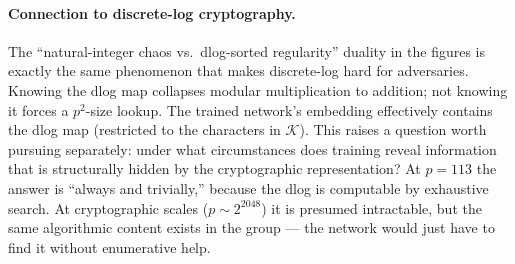 \paragraph{Connection to discrete-log cryptography.}  The
``natural-integer chaos vs.\ dlog-sorted regularity'' duality in the
figures is exactly the same phenomenon that makes discrete-log
hard for adversaries.  Knowing the dlog map collapses modular
multiplication to addition; not knowing it forces a $p^2$-size lookup.
The trained network's embedding effectively contains the dlog
map (restricted to the characters in $\mathcal{K}$).  This raises a
question worth pursuing separately: under what circumstances does
training reveal information that is structurally hidden by the
cryptographic representation?  At $p = 113$ the answer is ``always
and trivially,'' because the dlog is computable by exhaustive search.
At cryptographic scales ($p \sim 2^{2048}$) it is presumed
intractable, but the same algorithmic content exists in the group ---
the network would just have to find it without enumerative help.
